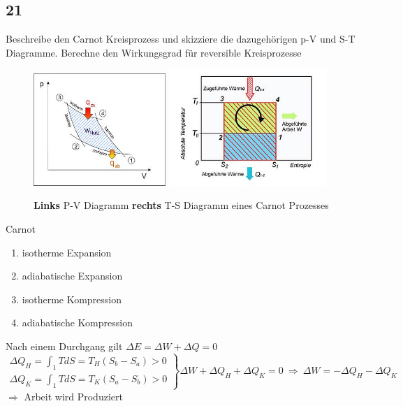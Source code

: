 \subsection{21}
\begin{myfrag}
Beschreibe den Carnot Kreisprozess und skizziere die dazugehörigen p-V und S-T
Diagramme. Berechne den Wirkungsgrad für reversible Kreisprozesse
\end{myfrag}
\begin{figure}[H]
\includegraphics[width=5cm]{Bilder/Frage21pV.jpg} 
\includegraphics[width=6cm]{Bilder/Frage21TS.jpg} 
\caption{\textbf{Links} P-V Diagramm \textbf{rechts} T-S Diagramm eines Carnot Prozesses}
\end{figure}
Carnot
\begin{enumerate}
\item isotherme Expansion
\item adiabatische Expansion
\item isotherme Kompression
\item adiabatische Kompression
\end{enumerate}
Nach einem Durchgang gilt $ \Delta E = \Delta W + \Delta Q = 0$
\\[2ex]
$\left. \begin{array}{c} \Delta Q_H = \int_1 TdS = T_H(S_b-S_a) > 0 \\ \Delta Q_K = \int_1 TdS = T_K(S_a-S_b) > 0
\end{array} \right\rbrace \Delta W + \Delta Q_H + \Delta Q_K = 0 \ \Rightarrow \ \Delta W = - \Delta Q_H - \Delta Q_K$ \\[1ex]
$\Rightarrow$  Arbeit wird Produziert \\[2ex]

